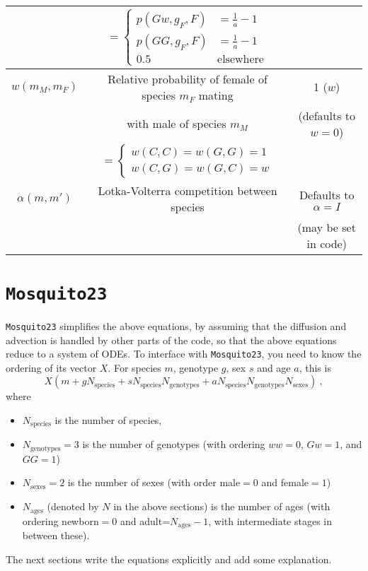 \documentclass[11pt,a4paper]{article}
\begin{document}
\begin{center}
\begin{tabular}{ |c|c|c|}
     & $ = \begin{cases}
		p(Gw, g_F, F) & = \frac{1}{a} - 1 \\
		p(GG, g_F, F) & = \frac{1}{a} - 1 \\
		0.5 & \textrm{elsewhere}
		\end{cases}$ &  \\
    \hline
		$w(m_M, m_F)$ & Relative probability of female of species $m_F$ mating & 1 ($w$) \\
		& with male of species $m_M$ & (defaults to $w=0$) \\
		& $ = \begin{cases}
		w(C,C) = w(G,G) = 1 \\
		w(C,G) = w(G,C) = w
		\end{cases}$ &  \\
		\hline
$\alpha(m, m')$ & Lotka-Volterra competition between species & Defaults to $\alpha=I$ \\
 & & (may be set in code)
\\
\hline
\end{tabular}
\end{center}

\section{{\tt Mosquito23}}

{\tt Mosquito23} simplifies the above equations, by assuming that the diffusion and advection is handled by other parts of the code, so that the above equations reduce to a system of ODEs.  To interface with {\tt Mosquito23}, you need to know the ordering of its vector $X$.  For species $m$, genotype $g$, sex $s$ and age $a$, this is
\begin{equation}
X\left(m + gN_{\mathrm{species}} + sN_{\mathrm{species}}N_{\mathrm{genotypes}} + aN_{\mathrm{species}}N_{\mathrm{genotypes}}N_{\mathrm{sexes}} \right) \ ,
\end{equation}
where
\begin{itemize}
\item $N_{\mathrm{species}}$ is the number of species,
\item $N_{\mathrm{genotypes}} = 3$ is the number of genotypes (with ordering $ww=0$, $Gw=1$, and $GG=1$)
\item $N_{\mathrm{sexes}} = 2$ is the number of sexes (with order male$=0$ and female$=1$)
\item $N_{\mathrm{ages}}$ (denoted by $N$ in the above sections) is the number of ages (with ordering newborn$=0$ and adult=$N_{\mathrm{ages}}-1$, with intermediate stages in between these).
\end{itemize}
The next sections write the equations explicitly and add some explanation.
\end{document}

